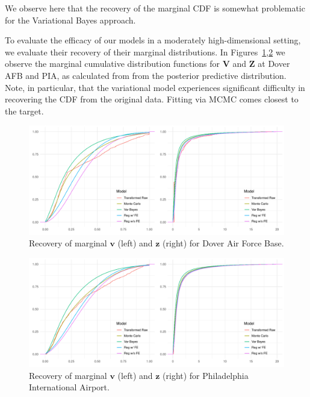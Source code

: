     
    
    
    We observe here that 
    the recovery of the marginal CDF is somewhat problematic for the Variational Bayes
    approach. 


To evaluate the efficacy of our models in a moderately high-dimensional setting,
    we evaluate their recovery of their marginal distributions.  In 
    Figures~\ref{plot:marginal_doverafb},\ref{plot:marginal_pia} we observe the marginal 
    cumulative distribution functions for $\bm{V}$ and $\bm{Z}$ at Dover AFB and PIA,
    as calculated from from the posterior predictive distribution.  Note, in particular,
    that the variational model experiences significant difficulty in recovering the
    CDF from the original data.  Fitting via MCMC comes closest to the target.
    
\begin{figure}[ht]
    \caption{Recovery of marginal $\bm{v}$ (left) and $\bm{z}$ (right) for 
        Dover Air Force Base.
        \label{plot:marginal_doverafb}}
    \centering
    \includegraphics[width=\textwidth]{./plots/delaware_marginal_dover_afb}
\end{figure}










\begin{figure}[ht]
    \caption{Recovery of marginal $\bm{v}$ (left) and $\bm{z}$ (right) for 
        Philadelphia International Airport.
        \label{plot:marginal_pia}}
    \centering
    \includegraphics[width=\textwidth]{./plots/delaware_marginal_phil_ia}
\end{figure}
